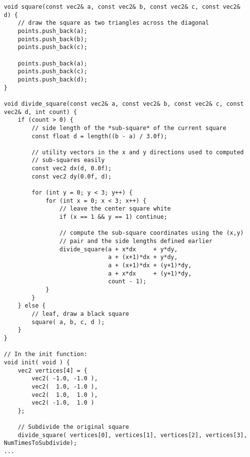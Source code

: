 \begin{lstlisting}
void square(const vec2& a, const vec2& b, const vec2& c, const vec2& d) {
	// draw the square as two triangles across the diagonal
    points.push_back(a);
	points.push_back(b);
	points.push_back(c);

	points.push_back(a);
	points.push_back(c);
	points.push_back(d);
}

void divide_square(const vec2& a, const vec2& b, const vec2& c, const vec2& d, int count) {
    if (count > 0) {
		// side length of the *sub-square* of the current square
		const float d = length((b - a) / 3.0f);

		// utility vectors in the x and y directions used to computed
		// sub-squares easily
		const vec2 dx(d, 0.0f);
		const vec2 dy(0.0f, d);

		for (int y = 0; y < 3; y++) {
			for (int x = 0; x < 3; x++) {
				// leave the center square white
				if (x == 1 && y == 1) continue;

				// compute the sub-square coordinates using the (x,y)
				// pair and the side lengths defined earlier
				divide_square(a + x*dx     + y*dy,
							  a + (x+1)*dx + y*dy,
							  a + (x+1)*dx + (y+1)*dy,
							  a + x*dx     + (y+1)*dy,
							  count - 1);
			}
		}
    } else {
		// leaf, draw a black square
        square( a, b, c, d );
    }
}

// In the init function:
void init( void ) {
    vec2 vertices[4] = {
        vec2( -1.0, -1.0 ),
		vec2(  1.0, -1.0 ),
		vec2(  1.0,  1.0 ),
        vec2( -1.0,  1.0 )
    };

    // Subdivide the original square
    divide_square( vertices[0], vertices[1], vertices[2], vertices[3], NumTimesToSubdivide);
...
\end{lstlisting}



